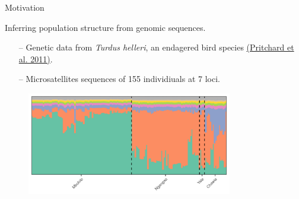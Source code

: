
\begin{frame}{Motivation}

Inferring population structure from genomic sequences.
\begin{itemize}
  \item[--] Genetic data from \textit{Turdus helleri}, an endagered bird species
  {\color{blue} \href{https://web.stanford.edu/group/pritchardlab/publications/pdfs/PritchardEtAl00.pdf}{(Pritchard et al. 2011)}}.
  \item[--] Microsatellites sequences of 155 individiuals at 7 loci.
\end{itemize}


\begin{figure}[!h]
\centering
\includegraphics[width = 0.8\textwidth]{./figures/structure_example.png}
\end{figure}

\end{frame}

